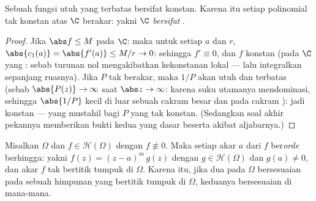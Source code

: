 \begin{corollary}
\label{cor:b3:holomorphic:liouville}
Sebuah fungsi utuh yang terbatas bersifat konstan. Karena itu setiap
polinomial tak konstan atas $\C$ berakar: yakni \emph{$\C$ bersifat
}.
\end{corollary}

\begin{proof}
Jika $\abs f \leq M$ pada $\C$: maka untuk setiap $a$ dan $r$, $\abs{c_1(a)}
= \abs{f'(a)} \leq M/r \to 0$: sehingga $f' \equiv 0$, dan $f$
konstan (pada $\C$ yang : sebab turunan nol mengakibatkan
kekonstanan lokal --- lalu integralkan sepanjang ruasnya). Jika $P$ tak
berakar, maka $1/P$ akan utuh dan terbatas (sebab $\abs{P(z)} \to
\infty$ saat $\abs z \to \infty$: karena suku utamanya mendominasi, sehingga
$\abs{1/P}$ kecil di luar sebuah cakram besar dan  pada
cakram ): jadi konstan --- yang mustahil bagi $P$ yang tak konstan.
(Sedangkan soal akhir pekannya memberikan bukti kedua yang dasar beserta
akibat aljabarnya.)
\end{proof}

\begin{theorem}
\label{thm:b3:holomorphic:identity}
Misalkan $\Omega$ \emph{} dan $f \in \mathcal
H(\Omega)$ dengan $f \not\equiv 0$. Maka setiap akar $a$ dari $f$ ber\emph{orde}
berhingga: yakni $f(z) = (z - a)^m\,g(z)$ dengan $g \in
\mathcal H(\Omega)$ dan $g(a) \neq 0$, dan akar $f$ tak
bertitik tumpuk di $\Omega$. Karena itu, jika dua
 pada $\Omega$ bersesuaian pada sebuah himpunan yang bertitik
tumpuk di $\Omega$, keduanya bersesuaian
di mana-mana.
\end{theorem}

